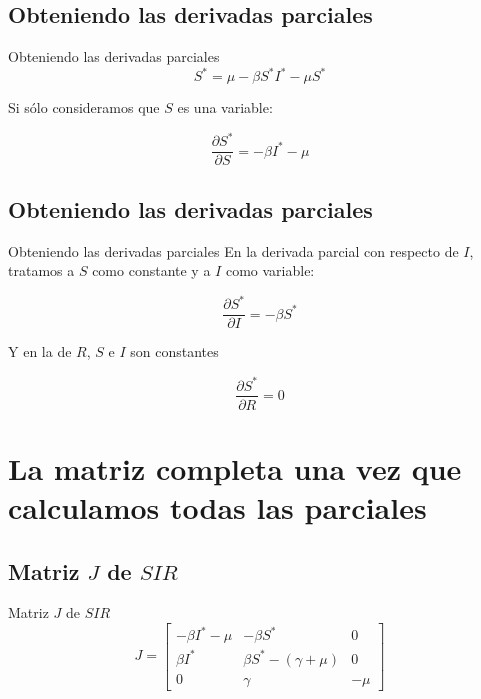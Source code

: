 \documentclass[
  11pt,
  ignorenonframetext,
]{beamer}
\begin{document}
\hypertarget{obteniendo-las-derivadas-parciales}{%
\subsection{Obteniendo las derivadas
parciales}\label{obteniendo-las-derivadas-parciales}}

\begin{frame}{Obteniendo las derivadas parciales}
\[S^* = \mu - \beta S^*I^* - \mu S^*\]

Si sólo consideramos que \(S\) es una variable:

\[\frac{\partial S^*}{\partial S} = -\beta I^* - \mu\]
\end{frame}

\hypertarget{obteniendo-las-derivadas-parciales-1}{%
\subsection{Obteniendo las derivadas
parciales}\label{obteniendo-las-derivadas-parciales-1}}

\begin{frame}{Obteniendo las derivadas parciales}
En la derivada parcial con respecto de \(I\), tratamos a \(S\) como
constante y a \(I\) como variable:

\[\frac{\partial S^*}{\partial I} = -\beta S^*\]

Y en la de \(R\), \(S\) e \(I\) son constantes

\[\frac{\partial S^*}{\partial R} = 0\]
\end{frame}

\hypertarget{la-matriz-completa-una-vez-que-calculamos-todas-las-parciales}{%
\section{La matriz completa una vez que calculamos todas las
parciales}\label{la-matriz-completa-una-vez-que-calculamos-todas-las-parciales}}

\hypertarget{matriz-j-de-sir}{%
\subsection{\texorpdfstring{Matriz \(J\) de
\(SIR\)}{Matriz J de SIR}}\label{matriz-j-de-sir}}

\begin{frame}{Matriz \(J\) de \(SIR\)}
\begin{equation}
J = \left[
\begin{matrix}
-\beta I^* - \mu & - \beta S^* &  0 \\
\beta I^* & \beta S^* - (\gamma + \mu) & 0 \\
0 & \gamma & -\mu
\end{matrix}
\right]
\end{equation}
\end{frame}
\end{document}
